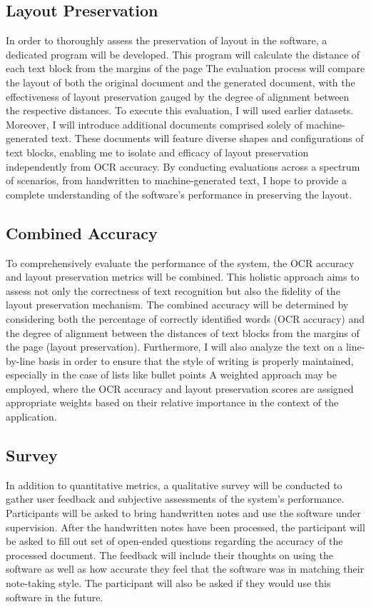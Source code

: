 \documentclass[10pt,twocolumn]{article}
\begin{document}
\subsection{Layout Preservation}
In order to thoroughly assess the preservation of layout in the software, a dedicated program will be developed. This program will  calculate the distance of each text block from the margins of the page The evaluation process will compare the layout of both the original document and the generated document, with the effectiveness of layout preservation gauged by the degree of alignment between the respective distances. To execute this evaluation, I will used earlier datasets. Moreover, I will introduce additional documents comprised solely of machine-generated text. These documents will feature diverse shapes and configurations of text blocks, enabling me to isolate and efficacy of layout preservation independently from OCR accuracy. By conducting evaluations across a spectrum of scenarios, from handwritten to machine-generated text, I hope to provide a complete understanding of the software's performance in preserving the layout. 

\subsection{Combined Accuracy}
To comprehensively evaluate the performance of the system, the OCR accuracy and layout preservation metrics will be combined. This holistic approach aims to assess not only the correctness of text recognition but also the fidelity of the layout preservation mechanism. The combined accuracy will be determined by considering both the percentage of correctly identified words (OCR accuracy) and the degree of alignment between the distances of text blocks from the margins of the page (layout preservation). Furthermore, I will also analyze the text on a line-by-line basis in order to ensure that the style of writing is properly maintained, especially in the case of lists like bullet points A weighted approach may be employed, where the OCR accuracy and layout preservation scores are assigned appropriate weights based on their relative importance in the context of the application.

\subsection{Survey}
In addition to quantitative metrics, a qualitative survey will be conducted to gather user feedback and subjective assessments of the system's performance. Participants will be asked to bring handwritten notes and use the software under supervision. After the handwritten notes have been processed, the participant will be asked to fill out set of open-ended questions regarding the accuracy of the processed document. The feedback will include their thoughts on using the software as well as how accurate they feel that the software was in matching their note-taking style. The participant will also be asked if they would use this software in the future. 
\end{document}
